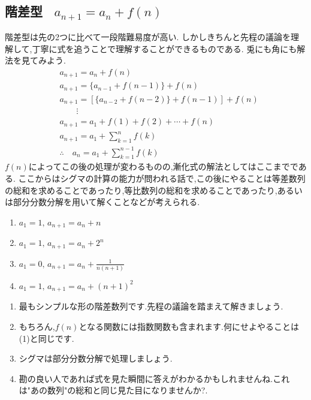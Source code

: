 
  \subsection{\texorpdfstring{階差型 \, $a_{n+1}=a_n+f(n)$}{階差型}}\label{節：階差型}
    階差型は先の2つに比べて一段階難易度が高い.
    しかしきちんと先程の議論を理解して,丁寧に式を追うことで理解することができるものである.
    兎にも角にも解法を見てみよう.
    \begin{align*}
      &a_{n+1}=a_n+f(n)\\
      &a_{n+1}=\{a_{n-1}+f(n-1)\}+f(n)\\
      &a_{n+1}=\left[\{a_{n-2}+f(n-2)\}+f(n-1)\right]+f(n)\\
      &\qquad \vdots\\
      &a_{n+1}=a_1+f(1)+f(2)+\cdots+f(n)\\
      &a_{n+1}=a_1+\sum_{k=1}^{n} f(k)\\
      &\therefore \quad a_n=a_1+\sum_{k=1}^{n-1} f(k)
    \end{align*}
    $f(n)$によってこの後の処理が変わるものの,漸化式の解法としてはここまでである.
    ここからはシグマの計算の能力が問われる話で,この後にやることは等差数列の総和を求めることであったり,等比数列の総和を求めることであったり,あるいは部分分数分解を用いて解くことなどが考えられる.

    \noindent {}
    \begin{enumerate}[label=(\arabic*),parsep=3pt,format=\bookitemlink{example-difference-1}{problem}{answer}]
      \item $\displaystyle a_1=1,\, a_{n+1}=a_n+n$
      \item $\displaystyle a_1=1,\, a_{n+1}=a_n+2^n$
      \item $\displaystyle a_1=0,\, a_{n+1}=a_n+\frac{1}{n(n+1)}$
      \item $\displaystyle a_1=1,\, a_{n+1}=a_n+(n+1)^2$
    \end{enumerate}

    \noindent{}
    \begin{enumerate}[label=(\arabic*),parsep=3pt,format=\bookitemlink{example-difference-1}{hint}{problem}]
      \item 最もシンプルな形の階差数列です.先程の議論を踏まえて解きましょう.
      \item もちろん,$f(n)$となる関数には指数関数も含まれます.何にせよやることは\,(1)と同じです.
      \item シグマは部分分数分解で処理しましょう.
      \item 勘の良い人であれば式を見た瞬間に答えがわかるかもしれませんね.これは"あの数列"の総和と同じ見た目になりませんか?.
    \end{enumerate}

